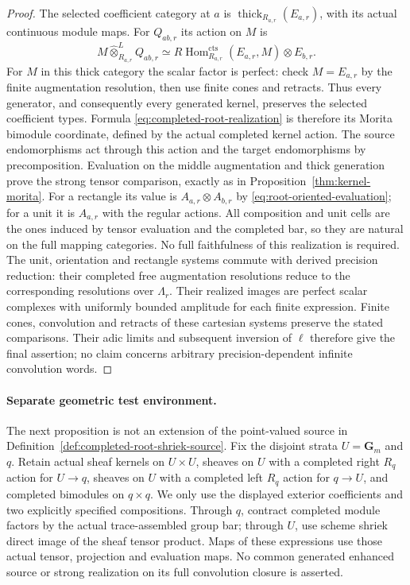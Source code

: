 \documentclass[11pt]{article}
\theoremstyle{definition}
\theoremstyle{remark}
\newcommand{\RHom}{R\operatorname{Hom}}
\begin{document}
\begin{proof}
The selected coefficient category at $a$ is
$\operatorname{thick}_{R_{a,r}}(E_{a,r})$, with its actual continuous
module maps.  For $Q_{ab,r}$ its action on $M$ is
\[
 M\widehat\otimes_{R_{a,r}}^L Q_{ab,r}
   \simeq \RHom_{R_{a,r}}^{\mathrm{cts}}(E_{a,r},M)
                 \otimes E_{b,r}.
\]
For $M$ in this thick category the scalar factor is perfect:
check $M=E_{a,r}$ by the finite augmentation resolution, then use
finite cones and retracts.  Thus every generator, and consequently
every generated kernel, preserves the selected coefficient types.
Formula \eqref{eq:completed-root-realization} is therefore its
Morita bimodule coordinate, defined by the actual completed kernel
action.  The source endomorphisms act through this action and the
target endomorphisms by precomposition.  Evaluation on the middle
augmentation and thick generation prove the strong tensor
comparison, exactly as in Proposition~\ref{thm:kernel-morita}.
For a rectangle its value is $A_{a,r}\otimes A_{b,r}$ by
\eqref{eq:root-oriented-evaluation}; for a unit it is $A_{a,r}$
with the regular actions.  All composition and unit cells are the
ones induced by tensor evaluation and the completed bar, so they
are natural on the full mapping categories.  No full faithfulness
of this realization is required.  The unit, orientation and rectangle
systems commute with derived precision reduction: their completed
free augmentation resolutions reduce to the corresponding resolutions
over $\Lambda_r$.  Their realized images are perfect scalar complexes
with uniformly bounded amplitude for each finite expression.  Finite
cones, convolution and retracts of these cartesian systems preserve
the stated comparisons.  Their adic limits and subsequent inversion
of $\ell$ therefore give the final assertion; no claim concerns
arbitrary precision-dependent infinite convolution words.
\end{proof}

\paragraph{Separate geometric test environment.}
The next proposition is not an extension of the point-valued source
in Definition~\ref{def:completed-root-shriek-source}.  Fix the disjoint
strata $U=\mathbf G_m$ and $q$.  Retain actual sheaf kernels on
$U\times U$, sheaves on $U$ with a completed right $R_q$ action for
$U\to q$, sheaves on $U$ with a completed left $R_q$ action for
$q\to U$, and completed bimodules on $q\times q$.
We only use the displayed exterior coefficients and two explicitly
specified compositions.  Through $q$, contract completed module
factors by the actual trace-assembled group bar; through $U$, use
scheme shriek direct image of the sheaf tensor product.  Maps of
these expressions use those actual tensor, projection and evaluation
maps.  No common generated enhanced source or strong realization on
its full convolution closure is asserted.
\end{document}
